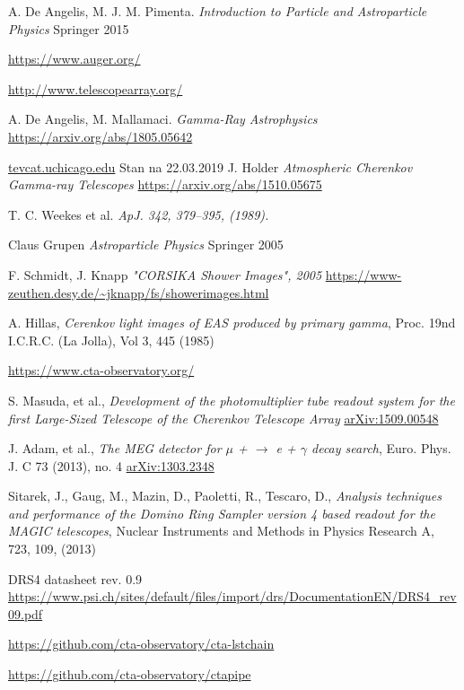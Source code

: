 \documentclass[a4paper,11pt,twoside]{article}
\begin{document}
\begin{thebibliography}{9}
A. De Angelis, M. J. M. Pimenta.
\textit{Introduction to Particle and Astroparticle Physics} Springer 2015

\url{https://www.auger.org/}

\url{http://www.telescopearray.org/}

A. De Angelis, M. Mallamaci.
\textit{Gamma-Ray Astrophysics} 
\url{https://arxiv.org/abs/1805.05642}

\url{tevcat.uchicago.edu}
Stan na 22.03.2019
J. Holder
\textit{Atmospheric Cherenkov Gamma-ray Telescopes}
\url{https://arxiv.org/abs/1510.05675}

T. C. Weekes et al.
\textit{ApJ. 342, 379–395, (1989).}

Claus Grupen
\textit{Astroparticle Physics} Springer 2005

F. Schmidt, J. Knapp
\textit{"CORSIKA Shower Images", 2005}
\url{https://www-zeuthen.desy.de/~jknapp/fs/showerimages.html}

A. Hillas, 
\textit{Cerenkov light images of EAS produced by primary gamma},
Proc. 19nd I.C.R.C. (La Jolla), Vol 3, 445 (1985)

\url{https://www.cta-observatory.org/}

S. Masuda, et al., 
\textit{Development of the photomultiplier tube readout
system for the first Large-Sized Telescope of the
Cherenkov Telescope Array}
\url{arXiv:1509.00548}

J. Adam, et al.,
\textit{The MEG detector for $\mu$ + $\rightarrow$ e + $\gamma$ decay search}, Euro. Phys. J. C 73 (2013), no. 4
\url{arXiv:1303.2348}

Sitarek, J., Gaug, M., Mazin, D., Paoletti, R., Tescaro, D., \textit{Analysis techniques and performance of the Domino Ring Sampler version 4 based readout for the MAGIC
telescopes}, Nuclear Instruments and Methods in Physics Research A, 723, 109, (2013)

DRS4 datasheet rev. 0.9
\url{https://www.psi.ch/sites/default/files/import/drs/DocumentationEN/DRS4_rev09.pdf}

\url{https://github.com/cta-observatory/cta-lstchain}

\url{https://github.com/cta-observatory/ctapipe}
\end{thebibliography}
\end{document}
